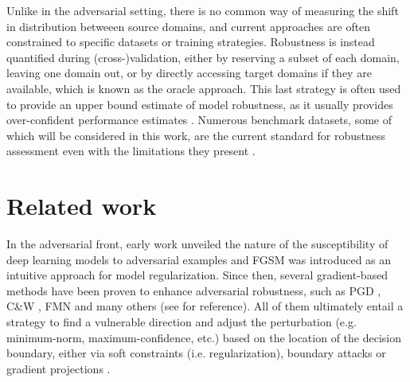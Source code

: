 Unlike in the adversarial setting, there is no common way of measuring
the shift in distribution betweeen source domains, and current approaches
are often constrained to specific datasets or training strategies. 
Robustness is instead quantified during (cross-)validation, either by reserving
a subset of each domain, leaving one domain out, or
by directly accessing target domains if they are available, 
which is known as the oracle approach. This last strategy is often
used to provide an upper bound estimate of model robustness, 
as it usually provides over-confident performance estimates
\cite{zhouDomainGeneralizationSurvey2022}.
Numerous benchmark datasets, some of which will be considered in this work, are the current 
standard for robustness assessment even with
the limitations they present
\cite{kohWILDSBenchmarkIntheWild2021}. 
\\


\section{Related work}

In the adversarial front, early work 
\cite{szegedyIntriguingPropertiesNeural2014}
unveiled the nature of the susceptibility of deep learning 
models to adversarial examples and FGSM 
\cite{goodfellowExplainingHarnessingAdversarial2015}
was introduced as an intuitive
approach for model regularization. 
Since then, several gradient-based methods have been
proven to enhance adversarial robustness, such as PGD
\cite{madryDeepLearningModels2019}, C\&W 
\cite{carliniEvaluatingRobustnessNeural2017},
FMN
\cite{pintorFastMinimumnormAdversarial2021} and
many others (see 
\cite{liReviewAdversarialAttack2022} for reference). 
All of them ultimately entail a strategy to find
a vulnerable direction and adjust the perturbation 
(e.g. minimum-norm, maximum-confidence, etc.)
based on the location of the decision boundary, either via soft
constraints (i.e. regularization), boundary attacks or gradient
projections
\cite{baiRecentAdvancesAdversarial2021}. \\

